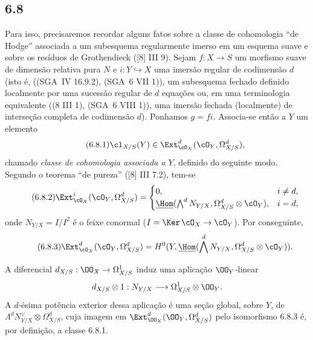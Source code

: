 \subsection*{6.8}
Para isso, precisaremos recordar alguns fatos sobre a classe de cohomologia ``de Hodge'' associada a um subesquema regularmente imerso em um esquema suave e sobre os resíduos de Grothendieck ([8] III 9). Sejam $f:X\to S$ um morfismo suave de dimensão relativa pura $N$ e $i:Y\hookrightarrow X$ uma imersão regular de codimensão $d$ (isto é, ((SGA~IV 16.9.2), (SGA~6 VII 1)), um subesquema fechado definido localmente por uma sucessão regular de $d$ equações ou, em uma terminologia equivalente ((8 III 1), (SGA~6 VIII 1)), uma imersão fechada (localmente) de interseção completa de codimensão $d$). Ponhamos $g=fi$. Associa-se então a $Y$ um elemento
\begin{equation}
\tag{6.8.1}
\cl_{X/S}(Y)\in\Ext^d_{\cO_X}(\cO_Y,\Omega^d_{X/S}),
\end{equation}
chamado \emph{classe de cohomologia associada a $Y$}, definido do seguinte modo. Segundo o teorema ``de pureza'' ([8] III 7.2), tem-se
\begin{equation}
\tag{6.8.2}
\Ext^i_{\cO_X}(\cO_Y,\Omega^d_{X/S})=
\begin{cases}
0,& i\ne d,\\
\underline{\Hom}(\bigwedge^d N_{Y/X},\Omega^d_{X/S}\otimes\cO_Y),& i=d,
\end{cases}
\end{equation}
onde $N_{Y/X}=I/I^2$ é o feixe conormal ($I=\Ker\,\cO_X\to\cO_Y$). Por conseguinte,
\begin{equation}
\tag{6.8.3}
\Ext^d_{\cO_X}(\cO_Y,\Omega^d_{X/S})=H^0(Y,\underline{\Hom}(\bigwedge^dN_{Y/X},\Omega^d_{X/S}\otimes\cO_Y)).
\end{equation}

A diferencial $d_{X/S}:\OO_X\to\Omega^1_{X/S}$ induz uma aplicação $\OO_Y$-linear
\[
d_{X/S}\otimes 1:N_{Y/X}\longrightarrow \Omega^1_{X/S}\otimes\OO_Y.
\]
A $d$-ésima potência exterior dessa aplicação é uma seção global, sobre $Y$, de $\Lambda^d N_{Y/X}^{\vee}\otimes\Omega^d_{X/S}$, cuja imagem em $\Ext^d_{\OO_X}(\OO_Y,\Omega^d_{X/S})$ pelo isomorfismo 6.8.3 é, por definição, a classe 6.8.1.

